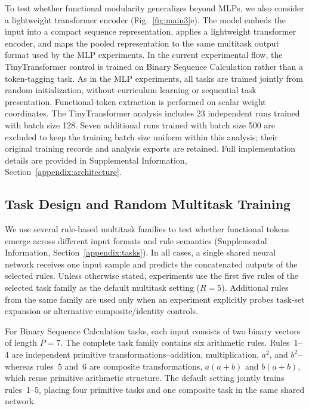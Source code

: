 \documentclass{article}
\begin{document}
To test whether functional modularity generalizes beyond MLPs, we also consider a lightweight transformer encoder (Fig.~\ref{fig:main3}e). The model embeds the input into a compact sequence representation, applies a lightweight transformer encoder, and maps the pooled representation to the same multitask output format used by the MLP experiments. In the current experimental flow, the TinyTransformer control is trained on Binary Sequence Calculation rather than a token-tagging task. As in the MLP experiments, all tasks are trained jointly from random initialization, without curriculum learning or sequential task presentation. Functional-token extraction is performed on scalar weight coordinates. The TinyTransformer analysis includes 23 independent runs trained with batch size 128. Seven additional runs trained with batch size 500 are excluded to keep the training batch size uniform within this analysis; their original training records and analysis exports are retained. Full implementation details are provided in Supplemental Information, Section~\ref{appendix:architecture}.

\subsection{Task Design and Random Multitask Training}
\label{method:task_design}

We use several rule-based multitask families to test whether functional tokens emerge across different input formats and rule semantics (Supplemental Information, Section~\ref{appendix:tasks}). In all cases, a single shared neural network receives one input sample and predicts the concatenated outputs of the selected rules. Unless otherwise stated, experiments use the first five rules of the selected task family as the default multitask setting ($R=5$). Additional rules from the same family are used only when an experiment explicitly probes task-set expansion or alternative composite/identity controls.

For Binary Sequence Calculation tasks, each input consists of two binary vectors of length $P=7$. The complete task family contains six arithmetic rules. Rules~1--4 are independent primitive transformations--addition, multiplication, $a^2$, and $b^2$--whereas rules~5 and~6 are composite transformations, $a(a+b)$ and $b(a+b)$, which reuse primitive arithmetic structure. The default setting jointly trains rules~1--5, placing four primitive tasks and one composite task in the same shared network.
\end{document}
